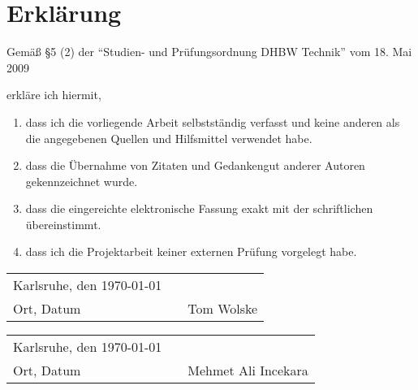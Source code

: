 
\section*{Erklärung}
\vspace*{2em}

Gemäß \S 5 (2) der \enquote{Studien- und Prüfungsordnung DHBW Technik} vom 18.
Mai 2009

erkläre ich hiermit, \\
\begin{enumerate}
\item dass ich die vorliegende Arbeit selbstständig verfasst und keine anderen als die
angegebenen Quellen und Hilfsmittel verwendet habe. 
\item dass die Übernahme von Zitaten und Gedankengut anderer Autoren gekennzeichnet wurde.
\item dass die eingereichte elektronische Fassung exakt mit der schriftlichen übereinstimmt.
\item dass ich die Projektarbeit keiner externen Prüfung vorgelegt habe.
\end{enumerate}

\vspace{3em}

\begin{tabular}{lp{2em}l}
 Karlsruhe, den \today  && \hspace{7cm} \\\cline{1-1}\cline{3-3}
 Ort, Datum     &&  Tom Wolske
\end{tabular} 

\begin{tabular}{lp{2em}l}
 Karlsruhe, den \today  && \hspace{7cm} \\\cline{1-1}\cline{3-3}
 Ort, Datum     &&  Mehmet Ali Incekara
\end{tabular} 

